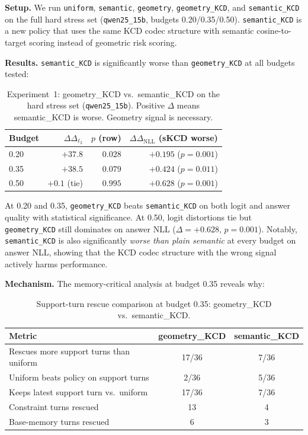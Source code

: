 \documentclass[conference]{IEEEtran}
\newcommand{\Logit}{\Delta_{\ell_2}}
\newcommand{\NLL}{\Delta_{\mathrm{NLL}}}
\begin{document}
\textbf{Setup.} We run \texttt{uniform}, \texttt{semantic}, \texttt{geometry}, \texttt{geometry\_KCD}, and \texttt{semantic\_KCD} on the full hard stress set (\texttt{qwen25\_15b}, budgets 0.20/0.35/0.50). \texttt{semantic\_KCD} is a new policy that uses the same KCD codec structure with semantic cosine-to-target scoring instead of geometric risk scoring.

\textbf{Results.} \texttt{semantic\_KCD} is significantly worse than \texttt{geometry\_KCD} at all budgets tested:

\begin{table}[t]
    \centering
    \caption{Experiment~1: geometry\_KCD vs.\ semantic\_KCD on the hard stress set (\texttt{qwen25\_15b}). Positive $\Delta$ means semantic\_KCD is worse. Geometry signal is necessary.}
    \label{tab:exp1_signal}
    \begin{tabular}{lrrr}
        \toprule
        Budget & $\Delta\Logit$ & $p$ (row) & $\Delta\NLL$ (sKCD worse) \\
        \midrule
        0.20 & $+37.8$ & $0.028$ & $+0.195$ ($p=0.001$) \\
        0.35 & $+38.5$ & $0.079$ & $+0.424$ ($p=0.011$) \\
        0.50 & $+0.1$ (tie) & $0.995$ & $+0.628$ ($p=0.001$) \\
        \bottomrule
    \end{tabular}
\end{table}

At 0.20 and 0.35, \texttt{geometry\_KCD} beats \texttt{semantic\_KCD} on both logit and answer quality with statistical significance. At 0.50, logit distortions tie but \texttt{geometry\_KCD} still dominates on answer NLL ($\Delta = +0.628$, $p=0.001$). Notably, \texttt{semantic\_KCD} is also significantly \emph{worse than plain semantic} at every budget on answer NLL, showing that the KCD codec structure with the wrong signal actively harms performance.

\textbf{Mechanism.} The memory-critical analysis at budget 0.35 reveals why:

\begin{table}[t]
    \centering
    \caption{Support-turn rescue comparison at budget 0.35: geometry\_KCD vs.\ semantic\_KCD.}
    \label{tab:exp1_mechanism}
    \begin{tabular}{lcc}
        \toprule
        Metric & geometry\_KCD & semantic\_KCD \\
        \midrule
        Rescues more support turns than uniform & 17/36 & 7/36 \\
        Uniform beats policy on support turns & 2/36 & 5/36 \\
        Keeps latest support turn vs.\ uniform & 17/36 & 7/36 \\
        Constraint turns rescued & 13 & 4 \\
        Base-memory turns rescued & 6 & 3 \\
        \bottomrule
    \end{tabular}
\end{table}
\end{document}
